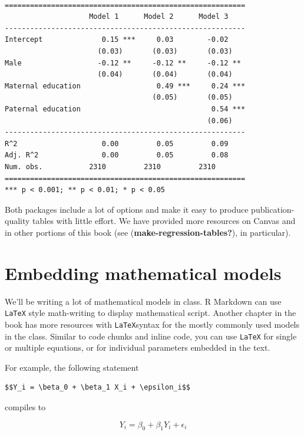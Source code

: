 \documentclass[
  letterpaper,
  DIV=11,
  numbers=noendperiod]{scrreprt}
\begin{document}
\begin{verbatim}

=========================================================
                    Model 1      Model 2      Model 3    
---------------------------------------------------------
Intercept              0.15 ***     0.03        -0.02    
                      (0.03)       (0.03)       (0.03)   
Male                  -0.12 **     -0.12 **     -0.12 ** 
                      (0.04)       (0.04)       (0.04)   
Maternal education                  0.49 ***     0.24 ***
                                   (0.05)       (0.05)   
Paternal education                               0.54 ***
                                                (0.06)   
---------------------------------------------------------
R^2                    0.00         0.05         0.09    
Adj. R^2               0.00         0.05         0.08    
Num. obs.           2310         2310         2310       
=========================================================
*** p < 0.001; ** p < 0.01; * p < 0.05
\end{verbatim}

Both packages include a lot of options and make it easy to produce
publication-quality tables with little effort. We have provided more
resources on Canvas and in other portions of this book (see
(\textbf{make-regression-tables?}), in particular).

\hypertarget{embedding-mathematical-models}{%
\section{Embedding mathematical
models}\label{embedding-mathematical-models}}

We'll be writing a lot of mathematical models in class. R Markdown can
use \texttt{LaTeX} style math-writing to display mathematical script.
Another chapter in the book has more resources with \texttt{LaTeX}syntax
for the mostly commonly used models in the class. Similar to code chunks
and inline code, you can use \texttt{LaTeX} for single or multiple
equations, or for individual parameters embedded in the text.

For example, the following statement

\begin{verbatim}
$$Y_i = \beta_0 + \beta_1 X_i + \epsilon_i$$
\end{verbatim}

compiles to

\[Y_i = \beta_0 + \beta_1 Y_i + \epsilon_i\]
\end{document}
